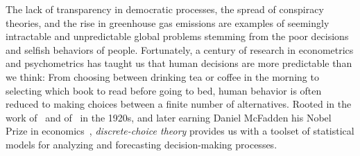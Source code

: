 The lack of transparency in democratic processes, the spread of conspiracy theories, and the rise in greenhouse gas emissions are examples of seemingly intractable and unpredictable global problems stemming from the poor decisions and selfish behaviors of people.
Fortunately, a century of research in econometrics and psychometrics has taught us that human decisions are more predictable than we think:
From choosing between drinking tea or coffee in the morning to selecting which book to read before going to bed, human behavior is often reduced to making choices between a finite number of alternatives.
Rooted in the work of~\citet{thurstone1927law} and of~\citet{zermelo1928berechnung} in the 1920s, and later earning Daniel McFadden his Nobel Prize in economics~\citep{mcfadden2001economic}, \emph{discrete-choice theory} provides us with a toolset of statistical models for analyzing and forecasting decision-making processes.

